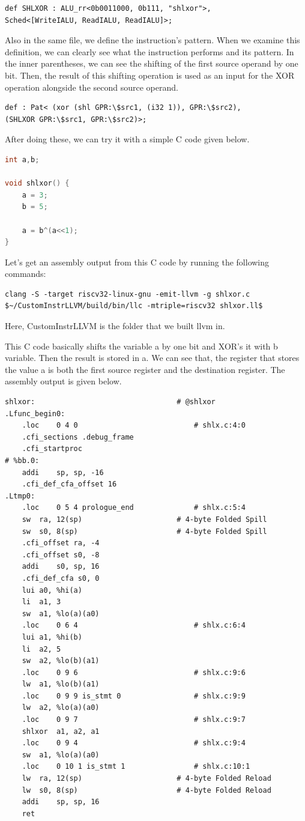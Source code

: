 \begin{lstlisting}
def SHLXOR : ALU_rr<0b0011000, 0b111, "shlxor">,
Sched<[WriteIALU, ReadIALU, ReadIALU]>;
\end{lstlisting}

Also in the same file, we define the instruction’s pattern. When we examine this definition, we can clearly see what the instruction performs and its pattern. In the inner parentheses, we can see the shifting of the first source operand by one bit. Then, the result of this shifting operation is used as an input for the XOR operation alongside the second source operand.

\begin{lstlisting}
def : Pat< (xor (shl GPR:\$src1, (i32 1)), GPR:\$src2),
(SHLXOR GPR:\$src1, GPR:\$src2)>;
\end{lstlisting}

After doing these, we can try it with a simple C code given below. 

\begin{lstlisting}[language=C++]
int a,b;

void shlxor() {
	a = 3;
	b = 5;
		
	a = b^(a<<1);
}
\end{lstlisting}

Let’s get an assembly output from this C code by running the following commands:

\begin{lstlisting}
clang -S -target riscv32-linux-gnu -emit-llvm -g shlxor.c
$~/CustomInstrLLVM/build/bin/llc -mtriple=riscv32 shlxor.ll$
\end{lstlisting}

Here, CustomInstrLLVM is the folder that we built llvm in.

This C code basically shifts the variable a by one bit and XOR’s it with b variable. Then the result is stored in a. We can see that, the register that stores the value a is both the first source register and the destination register. The assembly output is given below.

\begin{lstlisting}
shlxor:                                 # @shlxor
.Lfunc_begin0:
	.loc	0 4 0                           # shlx.c:4:0
	.cfi_sections .debug_frame
	.cfi_startproc
# %bb.0:
	addi	sp, sp, -16
	.cfi_def_cfa_offset 16
.Ltmp0:
	.loc	0 5 4 prologue_end              # shlx.c:5:4
	sw	ra, 12(sp)                      # 4-byte Folded Spill
	sw	s0, 8(sp)                       # 4-byte Folded Spill
	.cfi_offset ra, -4
	.cfi_offset s0, -8
	addi	s0, sp, 16
	.cfi_def_cfa s0, 0
	lui	a0, %hi(a)
	li	a1, 3
	sw	a1, %lo(a)(a0)
	.loc	0 6 4                           # shlx.c:6:4
	lui	a1, %hi(b)
	li	a2, 5
	sw	a2, %lo(b)(a1)
	.loc	0 9 6                           # shlx.c:9:6
	lw	a1, %lo(b)(a1)
	.loc	0 9 9 is_stmt 0                 # shlx.c:9:9
	lw	a2, %lo(a)(a0)
	.loc	0 9 7                           # shlx.c:9:7
	shlxor	a1, a2, a1
	.loc	0 9 4                           # shlx.c:9:4
	sw	a1, %lo(a)(a0)
	.loc	0 10 1 is_stmt 1                # shlx.c:10:1
	lw	ra, 12(sp)                      # 4-byte Folded Reload
	lw	s0, 8(sp)                       # 4-byte Folded Reload
	addi	sp, sp, 16
	ret
\end{lstlisting}

